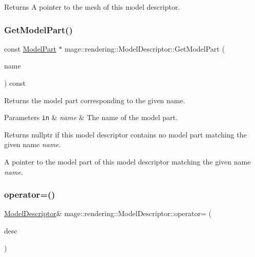 \begin{DoxyReturn}{Returns}
A pointer to the mesh of this model descriptor. 
\end{DoxyReturn}
\mbox{\label{classmage_1_1rendering_1_1_model_descriptor_a3a10002efd6bfdc701f5fc27c54d441f}} 
\subsubsection{\texorpdfstring{Get\+Model\+Part()}{GetModelPart()}}
{\footnotesize\ttfamily const \mbox{\hyperlink{structmage_1_1rendering_1_1_model_part}{Model\+Part}} $\ast$ mage\+::rendering\+::\+Model\+Descriptor\+::\+Get\+Model\+Part (\begin{DoxyParamCaption}\item[{std\+::string\+\_\+view}]{name }\end{DoxyParamCaption}) const\hspace{0.3cm}{\ttfamily [noexcept]}}

Returns the model part corresponding to the given name.


\begin{DoxyParams}[1]{Parameters}
\mbox{\tt in}  & {\em name} & The name of the model part. \\
\hline
\end{DoxyParams}
\begin{DoxyReturn}{Returns}
{\ttfamily nullptr} if this model descriptor contains no model part matching the given name {\itshape name}. 

A pointer to the model part of this model descriptor matching the given name {\itshape name}. 
\end{DoxyReturn}
\mbox{\label{classmage_1_1rendering_1_1_model_descriptor_a6d27a72aa2ebffbe4e7f2635f803dd72}} 
\subsubsection{\texorpdfstring{operator=()}{operator=()}\hspace{0.1cm}{\footnotesize\ttfamily [1/2]}}
{\footnotesize\ttfamily \mbox{\hyperlink{classmage_1_1rendering_1_1_model_descriptor}{Model\+Descriptor}}\& mage\+::rendering\+::\+Model\+Descriptor\+::operator= (\begin{DoxyParamCaption}\item[{const \mbox{\hyperlink{classmage_1_1rendering_1_1_model_descriptor}{Model\+Descriptor}} \&}]{desc }\end{DoxyParamCaption})\hspace{0.3cm}{\ttfamily [delete]}}

